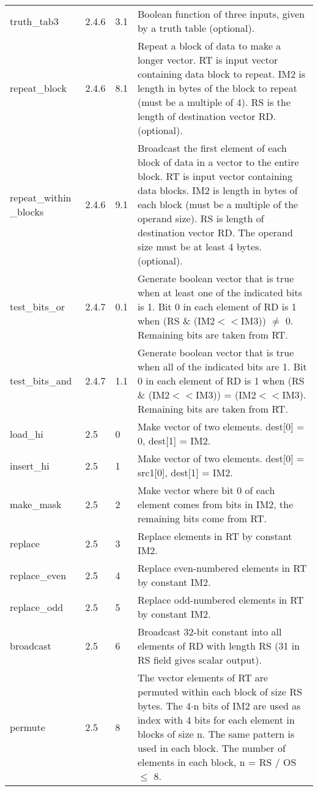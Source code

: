\documentclass[forwardcom.tex]{subfiles}
\begin{document}
\begin{longtable} {|p{20mm}|p{10mm}|p{8mm}|p{75mm}|}
truth\_tab3   & 2.4.6 & 3.1 & Boolean function of three inputs, given by a truth table (optional). \\

repeat\_block  & 2.4.6 & 8.1 & Repeat a block of data to make a longer vector. RT is input vector containing data block to repeat. IM2 is length in bytes of the block to repeat (must be a multiple of 4). RS is the length of destination vector RD. (optional). \\

repeat\_within \_blocks & 2.4.6 & 9.1 & Broadcast the first element of each block of data in a vector to the entire block. RT is input vector containing data blocks. IM2 is length in bytes of each block (must be a multiple of the operand size). RS is length of destination vector RD. The operand size must be at least 4 bytes. (optional). \\

test\_bits\_or & 2.4.7 & 0.1 & Generate boolean vector that is true when at least one of the indicated bits is 1. Bit 0 in each element of RD is 1 when (RS \& (IM2$<<$IM3)) $\neq$ 0. Remaining bits are taken from RT.\\

test\_bits\_and & 2.4.7 & 1.1 & Generate boolean vector that is true when all of the indicated bits are 1. Bit 0 in each element of RD is 1 when (RS \& (IM2$<<$IM3)) = (IM2$<<$IM3). Remaining bits are taken from RT.\\

load\_hi      & 2.5 & 0 & Make vector of two elements. dest[0] = 0, dest[1] = IM2. \\
insert\_hi    & 2.5 & 1 & Make vector of two elements. dest[0] = src1[0], dest[1] = IM2. \\
make\_mask    & 2.5 & 2 & Make vector where bit 0 of each element comes from bits in IM2, the remaining bits come from RT. \\
replace       & 2.5 & 3 & Replace elements in RT by constant IM2. \\
replace\_even & 2.5 & 4 & Replace even-numbered elements in RT by constant
IM2. \\
replace\_odd  & 2.5 & 5 & Replace odd-numbered elements in RT by constant
IM2. \\
broadcast     & 2.5 & 6 & Broadcast 32-bit constant into all elements of RD with length RS (31 in RS field gives scalar output). \\
permute       & 2.5 & 8 & The vector elements of RT are permuted within each block of size RS bytes. The 4$\cdot$n bits of IM2 are used as index with 4 bits for
each element in blocks of size n. The same pattern is used in each
block. The number of elements in each block, n = RS / OS $\leq$ 8. \\
\hline
\end{longtable}
\end{document}
